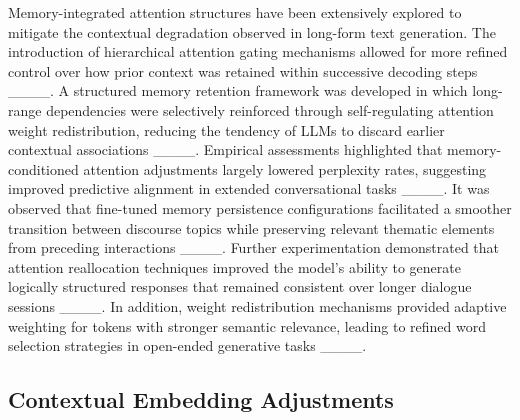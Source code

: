 Memory-integrated attention structures have been extensively explored to mitigate the contextual degradation observed in long-form text generation. The introduction of hierarchical attention gating mechanisms allowed for more refined control over how prior context was retained within successive decoding steps ____. A structured memory retention framework was developed in which long-range dependencies were selectively reinforced through self-regulating attention weight redistribution, reducing the tendency of LLMs to discard earlier contextual associations ____. Empirical assessments highlighted that memory-conditioned attention adjustments largely lowered perplexity rates, suggesting improved predictive alignment in extended conversational tasks ____. It was observed that fine-tuned memory persistence configurations facilitated a smoother transition between discourse topics while preserving relevant thematic elements from preceding interactions ____. Further experimentation demonstrated that attention reallocation techniques improved the model’s ability to generate logically structured responses that remained consistent over longer dialogue sessions ____. In addition, weight redistribution mechanisms provided adaptive weighting for tokens with stronger semantic relevance, leading to refined word selection strategies in open-ended generative tasks ____.

\subsection{Contextual Embedding Adjustments}

